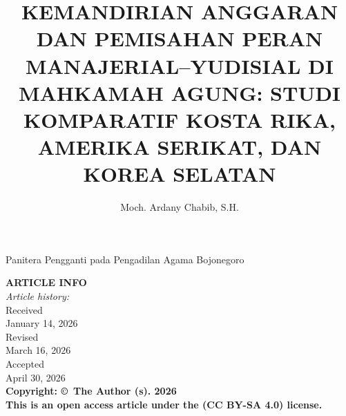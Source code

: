 \documentclass[12pt, a4paper]{article}
\title{\textbf{KEMANDIRIAN ANGGARAN DAN PEMISAHAN PERAN MANAJERIAL--YUDISIAL DI MAHKAMAH AGUNG: STUDI KOMPARATIF KOSTA RIKA, AMERIKA SERIKAT, DAN KOREA SELATAN}}
\author{Moch. Ardany Chabib, S.H.}
\date{}
\begin{document}
\maketitle
\begin{center}
    Panitera Pengganti pada Pengadilan Agama Bojonegoro
\end{center}

\vspace{1em}

\noindent
\begin{minipage}[t]{0.22\textwidth}
    \vspace{0pt}
    \fontsize{9}{11}\selectfont
    \centering
    \textbf{ARTICLE INFO}\\
    \textit{Article history:}\\
    Received\\
    January 14, 2026\\
    Revised\\
    March 16, 2026\\
    Accepted\\
    April 30, 2026\\
    \vspace{1em}
    \textbf{Copyright: \copyright~The Author (s). 2026}\\
    \textbf{This is an open access article under the (CC BY-SA 4.0) license.}\\
\end{minipage}%
\hfill\vrule\hfill%
\end{document}
